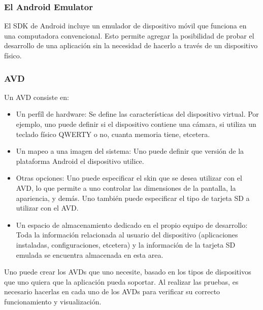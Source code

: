 \subsubsection{El Android Emulator}
\label{subsubsec:android.tools.emulator.1}

El \ac{SDK} de Android incluye un emulador de dispositivo m\'ovil que funciona en una computadora convencional. Esto permite agregar la posibilidad de probar el desarrollo de una aplicaci\'on sin la necesidad de hacerlo a trav\'es de un dispositivo f\'isico.~\cite{and.dev.emulator}

\subsubsection{\acf{AVD}}
\label{subsubsec:android.tools.avd.1}

Un \ac{AVD} consiste en:

\begin{itemize}
\item Un perf\'il de hardware: Se define las caracter\'isticas del dispositivo virtual. Por ejemplo, uno puede definir si el dispositivo contiene una c\'amara, si utiliza un teclado f\'isico QWERTY o no, cuanta memoria tiene, etcetera.

\item Un mapeo a una imagen del sistema: Uno puede definir que versi\'on de la plataforma Android el dispositivo utilice. 

\item Otras opciones: Uno puede especificar el skin que se desea utilizar con el \ac{AVD}, lo que permite a uno controlar las dimensiones de la pantalla, la apariencia, y dem\'as. Uno tambi\'en puede especificar el tipo de tarjeta \ac{SD} a utilizar con el \ac{AVD}.

\item Un espacio de almacenamiento dedicado en el propio equipo de desarrollo: Toda la informaci\'on relacionada al usuario del dispositivo (aplicaciones instaladas, configuraciones, etcetera) y la informaci\'on de la tarjeta \ac{SD} emulada se encuentra almacenada en esta area.
\end{itemize}

Uno puede crear los \ac{AVD}s que uno necesite, basado en los tipos de dispositivos que uno quiera que la aplicaci\'on pueda soportar. Al realizar las pruebas, es necesario hacerlas en cada uno de los \ac{AVD}s para verificar su correcto funcionamiento y visualizaci\'on.~\cite{and.dev.avd}
